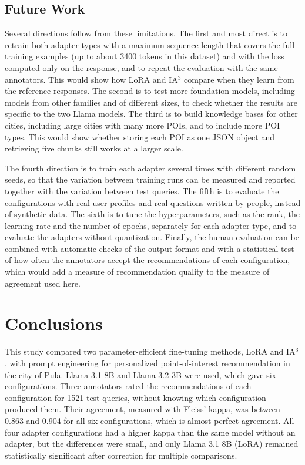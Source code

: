 \documentclass[journal,article,submit,pdftex,moreauthors]{Definitions/mdpi}
\begin{document}
\subsection{Future Work}
Several directions follow from these limitations. The first and most direct is to retrain both adapter types with a maximum sequence length that covers the full training examples (up to about 3400 tokens in this dataset) and with the loss computed only on the response, and to repeat the evaluation with the same annotators. This would show how LoRA and IA$^3$ compare when they learn from the reference responses. The second is to test more foundation models, including models from other families and of different sizes, to check whether the results are specific to the two Llama models. The third is to build knowledge bases for other cities, including large cities with many more POIs, and to include more POI types. This would show whether storing each POI as one JSON object and retrieving five chunks still works at a larger scale.

The fourth direction is to train each adapter several times with different random seeds, so that the variation between training runs can be measured and reported together with the variation between test queries. The fifth is to evaluate the configurations with real user profiles and real questions written by people, instead of synthetic data. The sixth is to tune the hyperparameters, such as the rank, the learning rate and the number of epochs, separately for each adapter type, and to evaluate the adapters without quantization. Finally, the human evaluation can be combined with automatic checks of the output format and with a statistical test of how often the annotators accept the recommendations of each configuration, which would add a measure of recommendation quality to the measure of agreement used here.

\section{Conclusions}\label{sec:conclusions}

This study compared two parameter-efficient fine-tuning methods, LoRA and IA$^3$, with prompt engineering for personalized point-of-interest recommendation in the city of Pula. Llama 3.1 8B and Llama 3.2 3B were used, which gave six configurations. Three annotators rated the recommendations of each configuration for 1521 test queries, without knowing which configuration produced them. Their agreement, measured with Fleiss' kappa, was between 0.863 and 0.904 for all six configurations, which is almost perfect agreement. All four adapter configurations had a higher kappa than the same model without an adapter, but the differences were small, and only Llama 3.1 8B (LoRA) remained statistically significant after correction for multiple comparisons.
\end{document}
